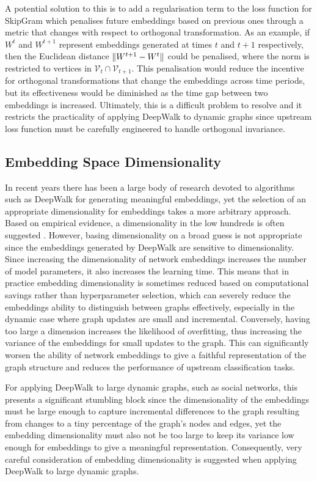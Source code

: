 \documentclass[a4paper]{article}
\renewcommand{\V}{\mathcal V}
\begin{document}
A potential solution to this is to add a regularisation term to the loss function for SkipGram which penalises future embeddings based on previous ones through a metric that changes with respect to orthogonal
transformation. As an example, if $W^t$ and $W^{t+1}$ represent embeddings generated at times $t$ and $t+1$ respectively, then the Euclidean distance $\lVert W^{t+1} - W^t\rVert$ could be penalised,
where the norm is restricted to vertices in $\V_t \cap \V_{t+1}$. This penalisation would reduce the incentive for orthogonal transformations that change the embeddings across time periods, but its
effectiveness would be diminished as the time gap between two embeddings is increased. Ultimately, this is a difficult problem to resolve and it restricts the practicality of applying DeepWalk to dynamic graphs since upstream loss function must be carefully engineered to handle orthogonal invariance.
\subsection{Embedding Space Dimensionality}
In recent years there has been a large body of research devoted to algorithms such as DeepWalk for generating meaningful embeddings, yet the selection of an appropriate dimensionality for embeddings
takes a more arbitrary approach. Based on empirical evidence, a dimensionality in the low hundreds is often suggested \cite{bradford2008}
. However, basing dimensionality on a broad guess is not appropriate since the embeddings generated by DeepWalk are sensitive to dimensionality.\\
Since increasing the dimensionality of network embeddings increases the number of model parameters, it also increases the learning time. This means that
in practice embedding dimensionality is sometimes reduced based on computational savings rather than hyperparameter selection, which can severely reduce the embeddings ability to
distinguish between graphs effectively, especially in the dynamic case where graph updates are small and incremental.
Conversely, having too large a dimension increases the likelihood of overfitting, thus increasing the variance of the embeddings for small updates to the graph. This can significantly
worsen the ability of network embeddings to give a faithful representation of the graph structure and reduces the performance of upstream classification
tasks.

For applying DeepWalk to large dynamic graphs, such as social networks, this presents a significant stumbling block since the dimensionality of the embeddings must be large enough to capture incremental differences
to the graph resulting from changes to a tiny percentage of the graph's nodes and edges, yet the embedding dimensionality must also not be too large to keep its variance low enough for embeddings to
give a meaningful representation. Consequently, very careful consideration of embedding dimensionality is suggested when applying DeepWalk to large dynamic graphs.
\end{document}
